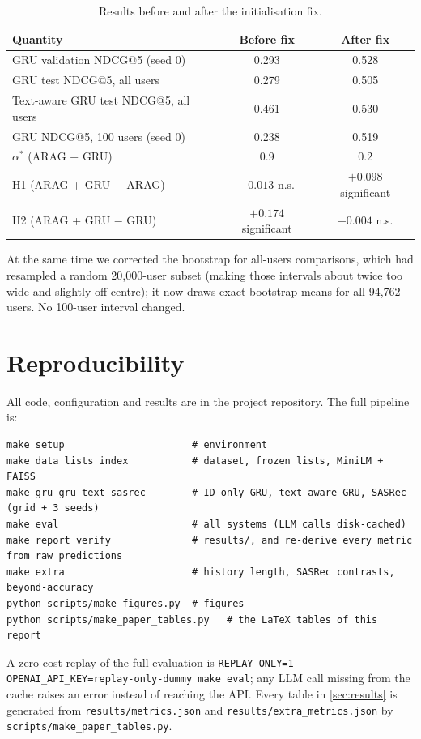\documentclass[11pt,a4paper]{article}
\begin{document}
\begin{table}[h]
\centering
\caption{Results before and after the initialisation fix.}
\label{tab:initbug}
\small
\begin{tabular}{lcc}
\toprule
Quantity & Before fix & After fix \\
\midrule
GRU validation NDCG@5 (seed 0) & 0.293 & 0.528 \\
GRU test NDCG@5, all users & 0.279 & 0.505 \\
Text-aware GRU test NDCG@5, all users & 0.461 & 0.530 \\
GRU NDCG@5, 100 users (seed 0) & 0.238 & 0.519 \\
$\alpha^*$ (ARAG + GRU) & 0.9 & 0.2 \\
H1 (ARAG + GRU $-$ ARAG) & $-0.013$ n.s. & $+0.098$ significant \\
H2 (ARAG + GRU $-$ GRU) & $+0.174$ significant & $+0.004$ n.s. \\
\bottomrule
\end{tabular}
\end{table}

At the same time we corrected the bootstrap for all-users comparisons, which had resampled a
random 20{,}000-user subset (making those intervals about twice too wide and slightly off-centre);
it now draws exact bootstrap means for all 94{,}762 users. No 100-user interval changed.

\section{Reproducibility}
\label{app:repro}

All code, configuration and results are in the project repository. The full pipeline is:
{\small
\begin{verbatim}
make setup                      # environment
make data lists index           # dataset, frozen lists, MiniLM + FAISS
make gru gru-text sasrec        # ID-only GRU, text-aware GRU, SASRec (grid + 3 seeds)
make eval                       # all systems (LLM calls disk-cached)
make report verify              # results/, and re-derive every metric from raw predictions
make extra                      # history length, SASRec contrasts, beyond-accuracy
python scripts/make_figures.py  # figures
python scripts/make_paper_tables.py   # the LaTeX tables of this report
\end{verbatim}
}
A zero-cost replay of the full evaluation is
\texttt{REPLAY\_ONLY=1 OPENAI\_API\_KEY=replay-only-dummy make eval}; any LLM call missing from
the cache raises an error instead of reaching the API. Every table in \cref{sec:results} is
generated from \texttt{results/metrics.json} and \texttt{results/extra\_metrics.json} by
\texttt{scripts/make\_paper\_tables.py}.
\end{document}
